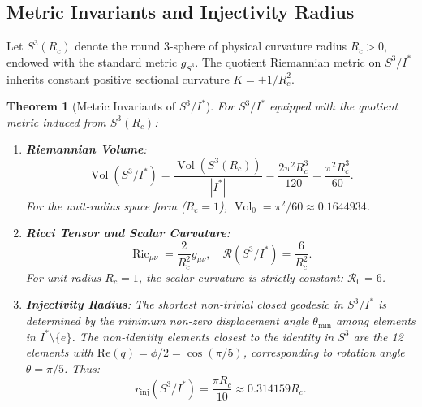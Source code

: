 \documentclass[11pt,a4paper]{article}
\newtheorem{theorem}{Theorem}[section]
\theoremstyle{definition}
\DeclareMathOperator{\Vol}{Vol}
\DeclareMathOperator{\Ric}{Ric}
\begin{document}
\subsection{Metric Invariants and Injectivity Radius}
Let $S^3(R_c)$ denote the round 3-sphere of physical curvature radius $R_c > 0$, endowed with the standard metric $g_{S^3}$. The quotient Riemannian metric on $S^3 / I^*$ inherits constant positive sectional curvature $K = +1/R_c^2$.

\begin{theorem}[Metric Invariants of $S^3 / I^*$]
For $S^3 / I^*$ equipped with the quotient metric induced from $S^3(R_c)$:
\begin{enumerate}
\item \textbf{Riemannian Volume}:
\begin{equation}
\Vol(S^3 / I^*) = \frac{\Vol(S^3(R_c))}{|I^*|} = \frac{2 \pi^2 R_c^3}{120} = \frac{\pi^2 R_c^3}{60}.
\end{equation}
For the unit-radius space form ($R_c = 1$), $\Vol_0 = \pi^2 / 60 \approx 0.1644934$.
\item \textbf{Ricci Tensor and Scalar Curvature}:
\begin{equation}
\Ric_{\mu \nu} = \frac{2}{R_c^2} g_{\mu \nu}, \quad \mathcal{R}(S^3 / I^*) = \frac{6}{R_c^2}.
\end{equation}
For unit radius $R_c = 1$, the scalar curvature is strictly constant: $\mathcal{R}_0 = 6$.
\item \textbf{Injectivity Radius}: The shortest non-trivial closed geodesic in $S^3 / I^*$ is determined by the minimum non-zero displacement angle $\theta_{\mathrm{min}}$ among elements in $I^* \setminus \{e\}$. The non-identity elements closest to the identity in $S^3$ are the 12 elements with $\mathrm{Re}(q) = \phi/2 = \cos(\pi/5)$, corresponding to rotation angle $\theta = \pi/5$. Thus:
\begin{equation}
r_{\mathrm{inj}}(S^3 / I^*) = \frac{\pi R_c}{10} \approx 0.314159 R_c.
\end{equation}
\end{enumerate}
\end{theorem}
\end{document}
